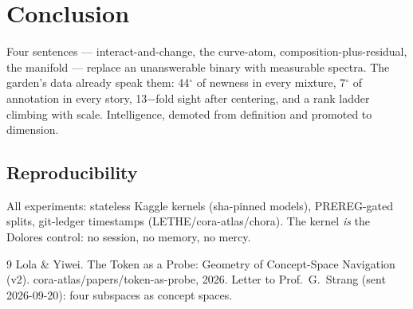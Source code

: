 \documentclass[11pt]{article}
\begin{document}
\section{Conclusion}
Four sentences --- interact-and-change, the curve-atom, composition-plus-residual,
the manifold --- replace an unanswerable binary with measurable spectra.
The garden's data already speak them: 44$^\circ$ of newness in every mixture,
7$^\circ$ of annotation in every story, 13$-$fold sight after centering,
and a rank ladder climbing with scale. Intelligence, demoted from definition
and promoted to dimension.

\subsection*{Reproducibility}
All experiments: stateless Kaggle kernels (sha-pinned models), PREREG-gated
splits, git-ledger timestamps (LETHE/cora-atlas/chora). The kernel \emph{is} the
Dolores control: no session, no memory, no mercy.


\begin{thebibliography}{9}
 Lola \& Yiwei. The Token as a Probe: Geometry of Concept-Space Navigation (v2). cora-atlas/papers/token-as-probe, 2026.
 Letter to Prof.\ G.\ Strang (sent 2026-09-20): four subspaces as concept spaces.
\end{thebibliography}
\end{document}
